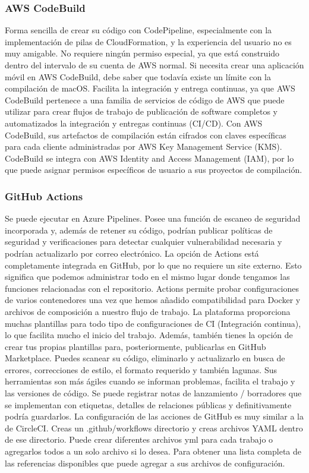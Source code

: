 \documentclass[twoside,twocolumn]{article}
\begin{document}
\subsubsection{AWS CodeBuild }
Forma sencilla de crear su código con CodePipeline, especialmente con la implementación de pilas de CloudFormation, y la experiencia del usuario no es muy amigable. No requiere ningún permiso especial, ya que está construido dentro del intervalo de su cuenta de AWS normal. Si necesita crear una aplicación móvil en AWS CodeBuild, debe saber que todavía existe un límite con la compilación de macOS. 
Facilita la integración y entrega continuas, ya que AWS CodeBuild pertenece a una familia de servicios de código de AWS que puede utilizar para crear flujos de trabajo de publicación de software completos y automatizados la integración y entregas continuas (CI/CD).  
Con AWS CodeBuild, sus artefactos de compilación están cifrados con claves específicas para cada cliente administradas por AWS Key Management Service (KMS). CodeBuild se integra con AWS Identity and Access Management (IAM), por lo que puede asignar permisos específicos de usuario a sus proyectos de compilación. 
\subsubsection{GitHub Actions }
Se puede ejecutar en Azure Pipelines. 
Posee una función de escaneo de seguridad incorporada y, además de retener su código, podrían publicar políticas de seguridad y verificaciones para detectar cualquier vulnerabilidad necesaria y podrían actualizarlo por correo electrónico. 
La opción de Actions está completamente integrada en GitHub, por lo que no requiere un site externo. Esto significa que podemos administrar todo en el mismo lugar donde tengamos las funciones relacionadas con el repositorio. 
Actions permite probar configuraciones de varios contenedores una vez que hemos añadido compatibilidad para Docker y archivos de composición a nuestro flujo de trabajo. 
La plataforma proporciona muchas plantillas para todo tipo de configuraciones de CI (Integración continua), lo que facilita mucho el inicio del trabajo. Además, también tienes la opción de crear tus propias plantillas para, posteriormente, publicarlas en GitHub Marketplace. 
Puedes scanear su código, eliminarlo y actualizarlo en busca de errores, correcciones de estilo, el formato requerido y también lagunas. 
Sus herramientas son más ágiles cuando se informan problemas, facilita el trabajo y las versiones de código. 
Se puede registrar notas de lanzamiento / borradores que se implementan con etiquetas, detalles de relaciones públicas y definitivamente podría guardarlos. 
La configuración de las acciones de GitHub es muy similar a la de CircleCI. Creas un  .github/workflows directorio y creas archivos YAML dentro de ese directorio. Puede crear diferentes archivos yml para cada trabajo o agregarlos todos a un solo archivo si lo desea. Para obtener una lista completa de las referencias disponibles que puede agregar a sus archivos de configuración. 
\end{document}

